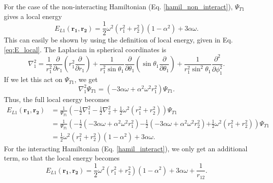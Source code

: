 \documentclass[%
 reprint,
nofootinbib,
aps,
]{revtex4-1}
\begin{document}
For the case of the non-interacting Hamiltonian (Eq. \eqref{hamil_non_interact}), $\Psi_{T1}$ gives a local energy
\begin{equation}
  E_{L1}(\mathbf{r_1}, \mathbf{r_2}) = \frac{1}{2}\omega^2\left(r_1^2 + r_2^2 \right)\left( 1 - \alpha^2  \right) + 3\alpha \omega.
\end{equation}
This can easily be shown by using the definition of local energy, given in Eq. \eqref{eq:E_local}.
The Laplacian in spherical coordinates is
\begin{equation}
\nabla_1^2 = \frac{1}{r_1^2}\frac{\partial}{\partial r_1}\left(r_1^2\frac{\partial}{\partial r_1}\right)
 + \frac{1}{r_1^2\sin\theta_1}\frac{\partial}{\partial\theta_1}\left(\sin\theta_1 \frac{\partial}{\partial\theta_1}\right)
 + \frac{1}{r_1^2\sin^2\theta_1}\frac{\partial^2}{\partial\phi_1^2}.
\end{equation}
If we let this act on $\Psi_{T1}$, we get
\begin{equation}
\nabla_1^2 \Psi_{T1} = \left(-3\alpha\omega + \alpha^2\omega^2r_1^2\right)\Psi_{T1}.
\end{equation}
Thus, the full local energy becomes
\begin{equation}
\begin{split}
 E_{L1}(\mathbf{r_1}, \mathbf{r_2}) &= \frac{1}{\Psi_{T1}}\left(-\frac{1}{2}\nabla_1^2 - \frac{1}{2}\nabla_2^2 + \frac{1}{2}\omega^2\left(r_1^2 + r_2^2\right)\right)\Psi_{T1}\\
 &= \frac{1}{\Psi_{T1}}\left(-\frac{1}{2}\left(-3\alpha\omega + \alpha^2\omega^2r_1^2\right)\right.
\left. - \frac{1}{2}\left(-3\alpha\omega + \alpha^2\omega^2r_2^2\right) \right.
\left. + \frac{1}{2}\omega^2\left(r_1^2 + r_2^2\right)\right)\Psi_{T1} \\ &=\frac{1}{2}\omega^2\left(r_1^2 + r_2^2 \right)\left( 1 - \alpha^2  \right) + 3\alpha \omega.
\end{split}
\end{equation}
For the interacting Hamiltonian (Eq. \eqref{hamil_interact}), we only get an additional term, so that the local energy becomes
\begin{equation}
  E_{L1}(\mathbf{r_1}, \mathbf{r_2}) = \frac{1}{2}\omega^2\left(r_1^2 + r_2^2 \right)\left( 1 - \alpha^2  \right) + 3\alpha \omega + \frac{1}{r_{12}}.
\end{equation}
\end{document}
